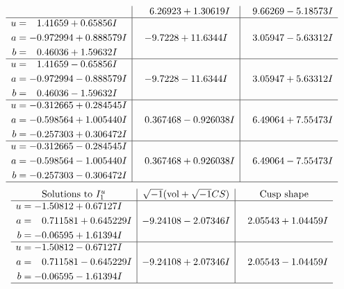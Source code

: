 \documentclass[1p]{elsarticle_modified}
\theoremstyle{definition}
\newcommand{\I}{\sqrt{-1}}
\begin{document}
$$\begin{array}{c|c|c}
 & \phantom{-}6.26923 + 1.30619 I & \phantom{-}9.66269 - 5.18573 I \\ \hline\begin{aligned}
u &= \phantom{-}1.41659 + 0.65856 I \\
a &= -0.972994 + 0.888579 I \\
b &= \phantom{-}0.46036 + 1.59632 I\end{aligned}
 & -9.7228 + 11.6344 I & \phantom{-}3.05947 - 5.63312 I \\ \hline\begin{aligned}
u &= \phantom{-}1.41659 - 0.65856 I \\
a &= -0.972994 - 0.888579 I \\
b &= \phantom{-}0.46036 - 1.59632 I\end{aligned}
 & -9.7228 - 11.6344 I & \phantom{-}3.05947 + 5.63312 I \\ \hline\begin{aligned}
u &= -0.312665 + 0.284545 I \\
a &= -0.598564 + 1.005440 I \\
b &= -0.257303 + 0.306472 I\end{aligned}
 & \phantom{-}0.367468 - 0.926038 I & \phantom{-}6.49064 + 7.55473 I \\ \hline\begin{aligned}
u &= -0.312665 - 0.284545 I \\
a &= -0.598564 - 1.005440 I \\
b &= -0.257303 - 0.306472 I\end{aligned}
 & \phantom{-}0.367468 + 0.926038 I & \phantom{-}6.49064 - 7.55473 I\\
 \hline 
 \end{array}$$\newpage$$\begin{array}{c|c|c}  
\text{Solutions to }I^u_{1}& \I (\text{vol} + \sqrt{-1}CS) & \text{Cusp shape}\\
 \hline 
\begin{aligned}
u &= -1.50812 + 0.67127 I \\
a &= \phantom{-}0.711581 + 0.645229 I \\
b &= -0.06595 + 1.61394 I\end{aligned}
 & -9.24108 - 2.07346 I & \phantom{-}2.05543 + 1.04459 I \\ \hline\begin{aligned}
u &= -1.50812 - 0.67127 I \\
a &= \phantom{-}0.711581 - 0.645229 I \\
b &= -0.06595 - 1.61394 I\end{aligned}
 & -9.24108 + 2.07346 I & \phantom{-}2.05543 - 1.04459 I\\
 \hline 
 \end{array}$$\newpage\newpage\renewcommand{\arraystretch}{1}
\end{document}
